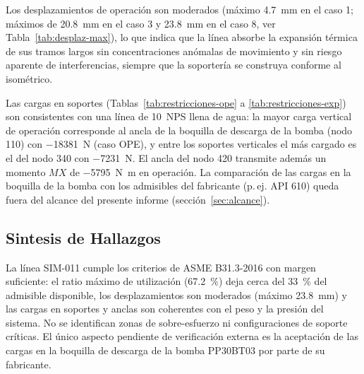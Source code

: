 Los desplazamientos de operaci\'{o}n son moderados (m\'{a}ximo 4.7~\si{mm} en el
caso 1; m\'{a}ximos de 20.8~\si{mm} en el caso 3 y 23.8~\si{mm} en el caso 8,
ver Tabla~\ref{tab:desplaz-max}), lo que indica que la l\'{i}nea absorbe la
expansi\'{o}n t\'{e}rmica de sus tramos largos sin concentraciones an\'{o}malas
de movimiento y sin riesgo aparente de interferencias, siempre que la
soporter\'{i}a se construya conforme al isom\'{e}trico.

Las cargas en soportes (Tablas~\ref{tab:restricciones-ope} a
\ref{tab:restricciones-exp}) son consistentes con una l\'{i}nea de 10~NPS
llena de agua: la mayor carga vertical de operaci\'{o}n corresponde al ancla de
la boquilla de descarga de la bomba (nodo 110) con \num{-18381}~\si{N} (caso
OPE), y entre los soportes verticales el m\'{a}s cargado es el del nodo 340 con
\num{-7231}~\si{N}. El ancla del nodo 420 transmite adem\'{a}s un momento
$MX$ de \num{-5795}~\si{N.m} en operaci\'{o}n. La comparaci\'{o}n de las cargas
en la boquilla de la bomba con los admisibles del fabricante (p.\,ej. API 610)
queda fuera del alcance del presente informe (secci\'{o}n~\ref{sec:alcance}).

\subsection{Sintesis de Hallazgos}

La l\'{i}nea SIM-011 cumple los criterios de ASME B31.3-2016 con margen
suficiente: el ratio m\'{a}ximo de utilizaci\'{o}n (67.2~\%) deja cerca del
33~\% del admisible disponible, los desplazamientos son moderados (m\'{a}ximo
23.8~\si{mm}) y las cargas en soportes y anclas son coherentes con el peso y la
presi\'{o}n del sistema. No se identifican zonas de sobre-esfuerzo ni
configuraciones de soporte cr\'{i}ticas. El \'{u}nico aspecto pendiente de
verificaci\'{o}n externa es la aceptaci\'{o}n de las cargas en la boquilla de
descarga de la bomba PP30BT03 por parte de su fabricante.
